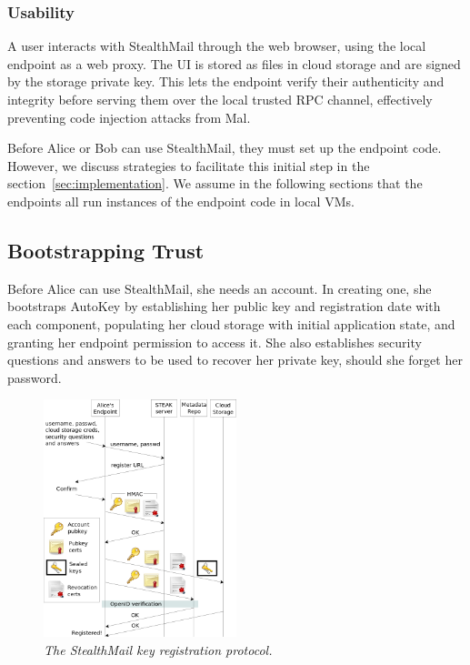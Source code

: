 \subsubsection{Usability}
A user interacts with StealthMail through the web browser, using the local endpoint as a web proxy.  The UI is stored as files in cloud storage and are signed by the storage private key.  This lets the endpoint verify their authenticity and integrity before serving them over the local trusted RPC channel, effectively preventing code injection attacks from Mal.

Before Alice or Bob can use StealthMail, they must set up the endpoint code.  However, we discuss strategies to facilitate this initial step in the section~\ref{sec:implementation}.  We assume in the following sections that the endpoints all run instances of the endpoint code in local VMs.

\subsection{Bootstrapping Trust}
Before Alice can use StealthMail, she needs an account.  In creating one, she bootstraps AutoKey by establishing her public key and registration date with each component, populating her cloud storage with initial application state, and granting her endpoint permission to access it.  She also establishes security questions and answers to be used to recover her private key, should she forget her password.

\begin{figure}[h!]
\centering
\includegraphics[width=0.5\textwidth]{figures/register}
\caption{\it The StealthMail key registration protocol.}
\label{fig:register}
\end{figure}

